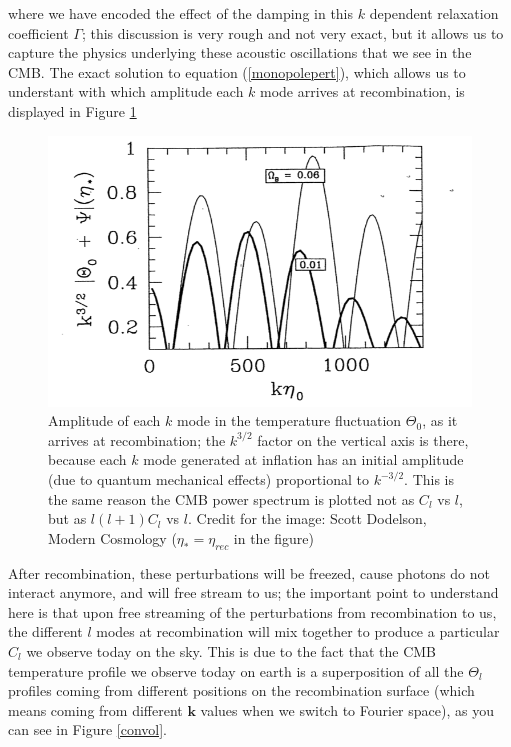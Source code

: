 \documentclass[11pt, a4paper,oneside,openright]{book}
\numberwithin{equation}{section}
\begin{document}
where we have encoded the effect of the damping in this $k$ dependent relaxation coefficient $\Gamma$; this discussion is very rough and not very exact, but it allows us to capture the physics underlying these acoustic oscillations that we see in the CMB. The exact solution to equation (\ref{monopolepert}), which allows us to understant with which amplitude each $k$ mode arrives at recombination, is displayed in Figure \ref{kpert} 
\begin{figure}
\begin{center}
\includegraphics[scale=1.0]{CMB/pert.png}
\end{center}
\caption{Amplitude of each $k$ mode in the temperature fluctuation $\Theta_0$, as it arrives at recombination; the $k^{3/2}$ factor on the vertical axis is there, because each $k$ mode generated at inflation has an initial amplitude (due to quantum mechanical effects) proportional to $k^{-3/2}$. This is the same reason the CMB power spectrum is plotted not as $C_l$ vs $l$, but as $l(l+1)C_l$ vs $l$. Credit for the image: Scott Dodelson, Modern Cosmology ($\eta_*=\eta_{rec}$ in the figure)}
\label{kpert}
\end{figure}
After recombination, these perturbations will be freezed, cause photons do not interact anymore, and will free stream to us; the important point to understand here is that upon free streaming of the perturbations from recombination to us, the different $l$ modes at recombination will mix together to produce a particular $C_l$ we observe today on the sky. This is due to the fact that the CMB temperature profile we observe today on earth is a superposition of all the $\Theta_l$ profiles coming from different positions on the recombination surface (which means coming from different $\mathbf{k}$ values when we switch to Fourier space), as you can see in Figure \ref{convol}.
\end{document}
